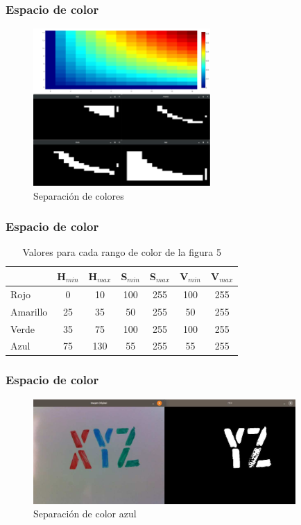 \documentclass[11pt]{beamer}
\begin{document}
  \begin{frame}
    \frametitle{Espacio de color}
    \begin{figure}[h]
      \includegraphics[height=6cm, keepaspectratio]{images/HSV.png}
      \caption{Separación de colores}
    \end{figure}
  \end{frame}
  \begin{frame}
    \frametitle{Espacio de color}
    \begin{table}[ht]
      \begin{center}
        \begin{tabular}[t]{lcccccc}
          \hline
                   & H$_{min}$ & H$_{max}$ & S$_{min}$ & S$_{max}$ & V$_{min}$ & V$_{max}$ \\
          \hline
          Rojo     & 0         & 10        & 100       & 255       & 100       & 255       \\
          Amarillo & 25        & 35        & 50        & 255       & 50        & 255       \\
          Verde    & 35        & 75        & 100       & 255       & 100       & 255       \\
          Azul     & 75        & 130       & 55        & 255       & 55        & 255       \\
          \hline
        \end{tabular}
        \caption{Valores para cada rango de color de la figura 5}
      \end{center}
    \end{table}
  \end{frame}
  \begin{frame}
    \frametitle{Espacio de color}
    \begin{figure}[h]
      \includegraphics[height=4cm, keepaspectratio]{images/hsv-separacion.png}
      \caption{Separación de color azul}
    \end{figure}
  \end{frame}
\end{document}
